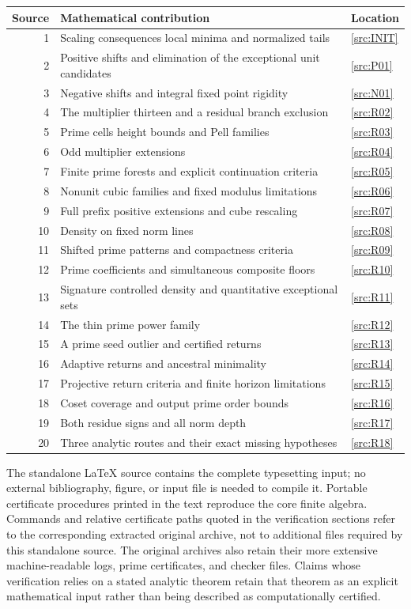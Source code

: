 \documentclass[11pt,a4paper]{article}
\theoremstyle{definition}\newtheorem{definition}[theorem]{Definition}
\theoremstyle{remark}\newtheorem{remark}[theorem]{Remark}
\begin{document}
\begin{longtable}{@{}rp{8.5cm}l@{}}
\toprule
Source & Mathematical contribution & Location\\\midrule\endhead
1 & Scaling consequences local minima and normalized tails & \ref{src:INIT}\\
2 & Positive shifts and elimination of the exceptional unit candidates & \ref{src:P01}\\
3 & Negative shifts and integral fixed point rigidity & \ref{src:N01}\\
4 & The multiplier thirteen and a residual branch exclusion & \ref{src:R02}\\
5 & Prime cells height bounds and Pell families & \ref{src:R03}\\
6 & Odd multiplier extensions & \ref{src:R04}\\
7 & Finite prime forests and explicit continuation criteria & \ref{src:R05}\\
8 & Nonunit cubic families and fixed modulus limitations & \ref{src:R06}\\
9 & Full prefix positive extensions and cube rescaling & \ref{src:R07}\\
10 & Density on fixed norm lines & \ref{src:R08}\\
11 & Shifted prime patterns and compactness criteria & \ref{src:R09}\\
12 & Prime coefficients and simultaneous composite floors & \ref{src:R10}\\
13 & Signature controlled density and quantitative exceptional sets & \ref{src:R11}\\
14 & The thin prime power family & \ref{src:R12}\\
15 & A prime seed outlier and certified returns & \ref{src:R13}\\
16 & Adaptive returns and ancestral minimality & \ref{src:R14}\\
17 & Projective return criteria and finite horizon limitations & \ref{src:R15}\\
18 & Coset coverage and output prime order bounds & \ref{src:R16}\\
19 & Both residue signs and all norm depth & \ref{src:R17}\\
20 & Three analytic routes and their exact missing hypotheses & \ref{src:R18}\\
\bottomrule\end{longtable}
The standalone \LaTeX{} source contains the complete typesetting input;
no external bibliography, figure, or input file is needed to compile it.
Portable certificate procedures printed in the text reproduce the core
finite algebra. Commands and relative certificate paths quoted in the verification sections refer to the corresponding extracted original archive, not to additional files required by this standalone source. The original archives also retain their more extensive
machine-readable logs, prime certificates, and checker files. Claims
whose verification relies on a stated analytic theorem retain that
theorem as an explicit mathematical input rather than being described
as computationally certified.
\end{document}
